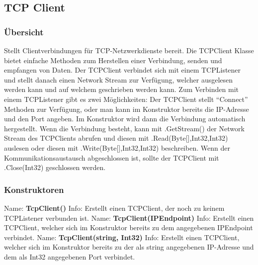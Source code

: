 \subsection{TCP Client} \label{tcpclient} %
\subsubsection{Übersicht}
Stellt Clientverbindungen für TCP-Netzwerkdienste bereit. Die TCPClient Klasse bietet einfache Methoden zum Herstellen einer Verbindung, senden und empfangen von Daten. Der TCPClient verbindet sich mit einem TCPListener und stellt danach einen Network Stream zur Verfügung, welcher ausgelesen werden kann und auf welchem geschrieben werden kann. Zum Verbinden mit einem TCPListener gibt es zwei Möglichkeiten:
Der TCPClient stellt “Connect” Methoden zur Verfügung, oder man kann im Konstruktor bereits die IP-Adresse und den Port angeben. Im Konstruktor wird dann die Verbindung automatisch hergestellt.
Wenn die Verbindung besteht, kann mit .GetStream() der Network Stream des TCPClients abrufen und diesen mit .Read(Byte[],Int32,Int32) auslesen oder diesen mit .Write(Byte[],Int32,Int32) beschreiben. Wenn der Kommunikationsaustausch abgeschlossen ist, sollte der TCPClient mit .Close(Int32) geschlossen werden.
\subsubsection{Konstruktoren}
Name: \textbf{TcpClient()}
\newline
Info: Erstellt einen TCPClient, der noch zu keinem TCPListener verbunden ist.
\newline
\newline
Name: \textbf{TcpClient(IPEndpoint)}
\newline
Info: Erstellt einen TCPClient, welcher sich im Konstruktor bereits zu dem angegebenen IPEndpoint verbindet.
\newline
\newline
Name: \textbf{TcpClient(string, Int32)}
\newline
Info: Erstellt einen TCPClient, welcher sich im Konstruktor bereits zu der als string angegebenen IP-Adresse und dem als Int32 angegebenen Port verbindet.

